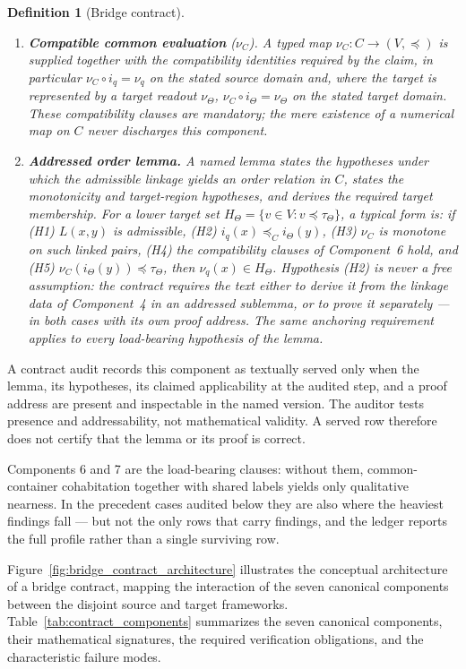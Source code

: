 \documentclass[11pt,a4paper]{article}
\newtheorem{definition}{Definition}[section]
\begin{document}
\begin{definition}[Bridge contract]
\begin{enumerate}
    container.
  \item \textbf{Compatible common evaluation} ($\nu_C$). A typed map
    $\nu_C\colon C\to(V,\preceq)$ is supplied together with the compatibility
    identities required by the claim, in particular $\nu_C\circ i_q=\nu_q$ on
    the stated source domain and, where the target is represented by a target
    readout $\nu_\Theta$, $\nu_C\circ i_\Theta=\nu_\Theta$ on the stated target
    domain. These compatibility clauses are mandatory; the mere existence of a
    numerical map on $C$ never discharges this component.
  \item \textbf{Addressed order lemma.} A named lemma states the hypotheses
    under which the admissible linkage yields an order relation in $C$, states
    the monotonicity and target-region hypotheses, and derives the required
    target membership. For a lower target set
    $H_\Theta=\{v\in V:v\preceq\tau_\Theta\}$, a typical form is: if (H1)
    $L(x,y)$ is admissible, (H2) $i_q(x)\preceq_C i_\Theta(y)$, (H3) $\nu_C$ is
    monotone on such linked pairs, (H4) the compatibility clauses of
    Component~6 hold, and (H5) $\nu_C(i_\Theta(y))\preceq\tau_\Theta$, then
    $\nu_q(x)\in H_\Theta$. Hypothesis (H2) is never a free assumption: the
    contract requires the text either to \emph{derive} it from the linkage
    data of Component~4 in an addressed sublemma, or to prove it separately
    --- in both cases with its own proof address. The same anchoring
    requirement applies to every load-bearing hypothesis of the lemma.
\end{enumerate}
\end{definition}

A contract audit records this component as textually served only when the
lemma, its hypotheses, its claimed applicability at the audited step, and a
proof address are present and inspectable in the named version. The auditor
tests presence and addressability, not mathematical validity. A served row
therefore does not certify that the lemma or its proof is correct.

Components 6 and 7 are the load-bearing clauses: without them, common-container
cohabitation together with shared labels yields only qualitative nearness. In
the precedent cases audited below they are also where the heaviest findings
fall --- but not the only rows that carry findings, and the ledger reports the
full profile rather than a single surviving row.

Figure~\ref{fig:bridge_contract_architecture} illustrates the conceptual architecture of a bridge contract, mapping the interaction of the seven canonical components between the disjoint source and target frameworks. Table~\ref{tab:contract_components} summarizes the seven canonical components, their mathematical signatures, the required verification obligations, and the characteristic failure modes.
\end{document}

